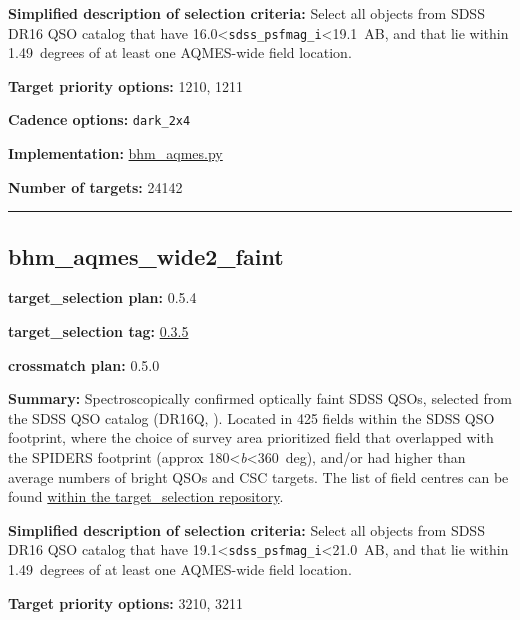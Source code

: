 \noindent\textbf{Simplified description of selection criteria:} Select all
objects from SDSS DR16 QSO catalog that have
16.0\textless{}\texttt{sdss\_psfmag\_i}\textless19.1~AB, and that lie
within 1.49~degrees of at least one AQMES-wide field location.


\noindent\textbf{Target priority options:} 1210, 1211

\noindent\textbf{Cadence options:} \texttt{dark\_2x4}

\noindent\textbf{Implementation:}
\href{https://github.com/sdss/target_selection/blob/0.3.5/python/target_selection/cartons/bhm_aqmes.py}{bhm\_aqmes.py}

\noindent\textbf{Number of targets:} 24142

\begin{center}\rule{0.5\linewidth}{0.5pt}\end{center}

\hypertarget{bhm_aqmes_wide2_faint_plan0.5.4}{%
\subsection{bhm\_aqmes\_wide2\_faint}\label{bhm_aqmes_wide2_faint_plan0.5.4}}

\noindent\textbf{target\_selection plan:} 0.5.4

\noindent\textbf{target\_selection tag:}
\href{https://github.com/sdss/target_selection/tree/0.3.5/}{0.3.5}

\noindent\textbf{crossmatch plan:} 0.5.0

\noindent\textbf{Summary:} Spectroscopically confirmed optically faint SDSS QSOs,
selected from the SDSS QSO catalog (DR16Q,
\citealt{Lyke2020}). Located in 425 fields within the SDSS QSO footprint,
where the choice of survey area prioritized field that overlapped with
the SPIDERS footprint (approx 180\textless{}\emph{b}\textless360~deg),
and/or had higher than average numbers of bright QSOs and CSC targets.
The list of field centres can be found
\href{https://github.com/sdss/target_selection/blob/0.3.0/python/target_selection/masks/candidate_target_fields_bhm_aqmes_wide_v0.3.1.fits}{within
the target\_selection repository}.

\noindent\textbf{Simplified description of selection criteria:} Select all
objects from SDSS DR16 QSO catalog that have
19.1\textless{}\texttt{sdss\_psfmag\_i}\textless21.0~AB, and that lie
within 1.49~degrees of at least one AQMES-wide field location.


\noindent\textbf{Target priority options:} 3210, 3211

